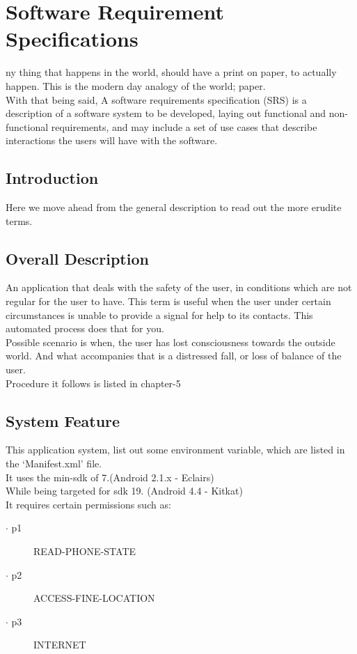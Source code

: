 %
%
\let\textcircled=\pgftextcircled
\chapter{Software Requirement Specifications}
\label{chap:intro}

ny thing that happens in the world, should have a print on paper, to actually happen. This is the modern day analogy of the world; paper.\\
 With that being said, A software requirements specification (SRS) is a description of a software system to be developed, laying out functional and non-functional requirements, and may include a set of use cases that describe interactions the users will have with the software.




\section{Introduction}
\label{sec:sec01}

Here we move ahead from the general description to read out the more erudite terms.


\section{Overall Description}
\label{sec:sec02}

An application that deals with the safety of the user, in conditions which are not regular for the user to have.
This term is useful when the user under certain circumstances is unable to provide a signal for help to its contacts.
This automated process does that for you. \\
Possible scenario is when, the user has lost consciousness towards the outside world. And what accompanies that is a distressed fall, or loss of balance of the user.\\
Procedure it follows is listed in chapter-5

\section{System Feature}
\label{sec:sec03}

This application system, list out some environment variable, which are listed in the `Manifest.xml' file.\\
It uses the min-sdk of 7.(Android 2.1.x - Eclairs) \\
While being targeted for sdk 19. (Android 4.4 - Kitkat) \\
It requires certain permissions such as:
\begin{description}
\item[$\cdot$ p1] READ-PHONE-STATE
\item[$\cdot$ p2] ACCESS-FINE-LOCATION
\item[$\cdot$ p3] INTERNET
\end{description}

